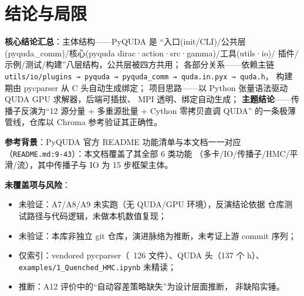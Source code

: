 \documentclass[UTF8]{ctexart}
\begin{document}
\section{结论与局限}
\begin{conclbox}
\textbf{核心结论汇总}：\textcolor{struct}{主体结构}——PyQUDA 是
“入口(init/CLI)/公共层(pyquda\_comm)/核心(pyquda dirac·action·src·gamma)/工具(utils·io)/
插件/示例/测试/构建”八层结构，公共层被四方共用；
\textcolor{relation}{各部分关系}——依赖主链
\texttt{utils/io/plugins → pyquda → pyquda\_comm → quda.in.pyx → quda.h}，
构建期由 pycparser 从 C 头自动生成绑定；
\textcolor{idea}{项目思路}——以 Python 张量语法驱动 QUDA GPU 求解器，后端可插拔、
MPI 透明、绑定自动生成；
\textbf{主题结论}——传播子反演为“12 源分量 + 多重源批量 + Cython 零拷贝直调 QUDA”
的一条极薄管线，仓库以 Chroma 参考验证其正确性。
\end{conclbox}

\begin{refbox}
\textbf{参考背景}：PyQUDA 官方 README 功能清单与本文档一一对应
（\texttt{\nolinkurl{README.md:9-43}}）：本文档覆盖了其全部 6 类功能
（多卡/IO/传播子/HMC/平滑/流），其中传播子与 IO 为 15 步框架主体。
\end{refbox}

\begin{warnbox}
\textbf{未覆盖项与风险}：
\begin{itemize}
  \item \textcolor{warn}{未验证}：A7/A8/A9 未实跑（无 QUDA/GPU 环境），反演结论依据
        仓库测试路径与代码逻辑，未做本机数值复现；
  \item \textcolor{warn}{未验证}：本库非独立 git 仓库，演进脉络为推断，未考证上游 commit 序列；
  \item \textcolor{warn}{仅索引}：vendored pycparser（~126 文件）、QUDA 头（137 个 h）、
        \texttt{examples/1\_Quenched\_HMC.ipynb} 未精读；
  \item \textcolor{relation}{推断}：A12 评价中的“自动容差策略缺失”为设计层面推断，
        非缺陷实锤。
\end{itemize}
\end{warnbox}
\end{document}
